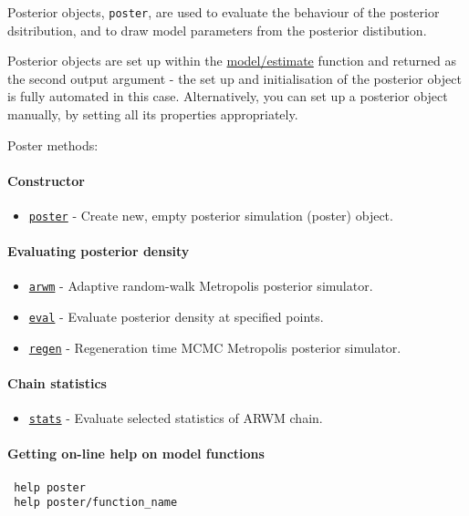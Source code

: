 

	Posterior objects, \texttt{poster}, are used to evaluate the behaviour
 of the posterior dsitribution, and to draw model parameters from the
 posterior distibution.
 
 Posterior objects are set up within the \url{model/estimate} function
 and returned as the second output argument - the set up and
 initialisation of the posterior object is fully automated in this case.
 Alternatively, you can set up a posterior object manually, by setting
 all its properties appropriately.
 
 Poster methods:
 
 \paragraph{Constructor}
 
 \begin{itemize}
 \item
   \href{poster/poster}{\texttt{poster}} - Create new, empty posterior
   simulation (poster) object.
 \end{itemize}
 
 \paragraph{Evaluating posterior density}
 
 \begin{itemize}
 \item
   \href{poster/arwm}{\texttt{arwm}} - Adaptive random-walk Metropolis
   posterior simulator.
 \item
   \href{poster/eval}{\texttt{eval}} - Evaluate posterior density at
   specified points.
 \item
   \href{poster/regen}{\texttt{regen}} - Regeneration time MCMC
   Metropolis posterior simulator.
 \end{itemize}
 
 \paragraph{Chain statistics}
 
 \begin{itemize}
 \item
   \href{poster/stats}{\texttt{stats}} - Evaluate selected statistics of
   ARWM chain.
 \end{itemize}
 
 \paragraph{Getting on-line help on model functions}
 
 \begin{verbatim}
 help poster
 help poster/function_name
 \end{verbatim}



